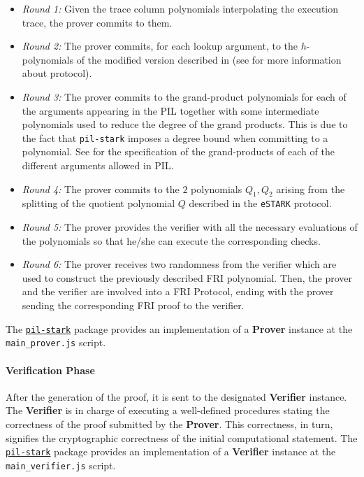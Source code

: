 \begin{itemize}

\item \textit{Round 1:} Given the trace column polynomials interpolating the execution trace, the prover commits to them.

\item \textit{Round 2:} The prover commits, for each lookup argument, to the $h$-polynomials of the modified \plookup version described in \cite{EPRINT:PFMBM22} (see \cite{EPRINT:GabWil20} for more information about \plookup protocol).

\item \textit{Round 3:} The prover commits to the grand-product polynomials for each of the arguments appearing in the PIL together with some intermediate polynomials used to reduce the degree of the grand products. This is due to the fact that \texttt{pil-stark} imposes a degree bound when committing to a polynomial. See \cite{EPRINT:GabWilCio19, EPRINT:GabWil20} for the specification of the grand-products of each of the different arguments allowed in PIL.

\item \textit{Round 4:} The prover commits to the $2$ polynomials $Q_1, Q_2$ arising from the splitting of the quotient polynomial $Q$ described in the \texttt{eSTARK} protocol.

\item \textit{Round 5:} The prover provides the verifier with all the necessary evaluations of the polynomials so that he/she can execute the corresponding checks.

\item \textit{Round 6:} The prover receives two randomness from the verifier which are used to construct the previously described FRI polynomial. Then, the prover and the verifier are involved into a FRI Protocol, ending with the prover sending the corresponding FRI proof to the verifier.

\end{itemize}


The \href{https://github.com/0xPolygonHermez/pil-stark}{\texttt{pil-stark}} package provides an implementation of a \textbf{Prover} instance at the \texttt{main\_prover.js} script.


\paragraph*{Verification Phase}

After the generation of the proof, it is sent to the designated \textbf{Verifier} instance. The \textbf{Verifier} is in charge of executing a well-defined procedures stating the correctness of the proof submitted by the \textbf{Prover}. This correctness, in turn, signifies the cryptographic correctness of the initial computational statement. The \href{https://github.com/0xPolygonHermez/pil-stark}{\texttt{pil-stark}} package provides an implementation of a \textbf{Verifier} instance at the \texttt{main\_verifier.js} script.